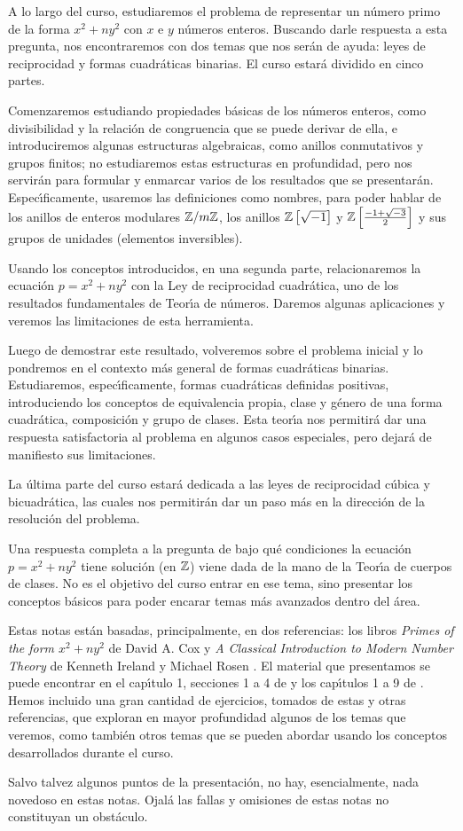 A lo largo del curso, estudiaremos el problema de representar un n\'umero
primo de la forma $x^2+ny^2$ con $x$ e $y$ n\'umeros enteros.
Buscando darle respuesta a esta pregunta, nos encontraremos con dos temas que
nos ser\'an de ayuda: leyes de reciprocidad y formas cuadr\'aticas binarias.
El curso estar\'a dividido en cinco partes.

Comenzaremos estudiando propiedades b\'asicas de los n\'umeros enteros,
como divisibilidad y la relaci\'on de congruencia que se puede derivar de
ella, e introduciremos algunas estructuras algebraicas, como anillos
conmutativos y grupos finitos; no estudiaremos estas estructuras en
profundidad, pero nos servir\'an para formular y enmarcar varios de los
resultados que se presentar\'an. Espec\'{\i}ficamente, usaremos las
definiciones como nombres, para poder hablar de los anillos de enteros
modulares $\Enterosmod[m]$, los anillos $\polinomios \Enteros{\sqrt{-1}}$ y
$\polinomios \Enteros{\frac{-1+\sqrt{-3}} 2}$ y sus grupos de unidades
(elementos inversibles).

Usando los conceptos introducidos, en una segunda parte, relacionaremos
la ecuaci\'on $p=x^2+ny^2$ con la Ley de reciprocidad cuadr\'atica,
uno de los resultados fundamentales de Teor\'{\i}a de n\'umeros.
Daremos algunas aplicaciones y veremos las limitaciones de esta herramienta.

Luego de demostrar este resultado, volveremos sobre el problema inicial y
lo pondremos en el contexto m\'as general de formas cuadr\'aticas binarias.
Estudiaremos, espec\'{\i}ficamente, formas cuadr\'aticas definidas positivas,
introduciendo los conceptos de equivalencia propia, clase y g\'enero de una
forma cuadr\'atica, composici\'on y grupo de clases. Esta teor\'{\i}a nos
permitir\'a dar una respuesta satisfactoria al problema en algunos casos
especiales, pero dejar\'a de manifiesto sus limitaciones.

La \'ultima parte del curso estar\'a dedicada a las leyes de reciprocidad
c\'ubica y bicuadr\'atica, las cuales nos permitir\'an dar un paso m\'as en
la direcci\'on de la resoluci\'on del problema.

Una respuesta completa a la pregunta de bajo qu\'e condiciones la ecuaci\'on
$p=x^2+ny^2$ tiene soluci\'on (en $\Enteros$) viene dada de la mano de la
Teor\'{\i}a de cuerpos de clases. No es el objetivo del curso entrar en ese
tema, sino presentar los conceptos b\'asicos para poder encarar temas m\'as
avanzados dentro del \'area.

Estas notas est\'an basadas, principalmente, en dos referencias: los libros
\emph{Primes of the form $x^2+ny^2$} de David A. Cox \cite{Cox} y
\emph{A Classical Introduction to Modern Number Theory} de Kenneth Ireland y
Michael Rosen \cite{IrelandRosen}.
El material que presentamos se puede encontrar en el cap\'{\i}tulo 1,
secciones 1 a 4 de \cite{Cox} y los cap\'{\i}tulos 1 a 9 de
\cite{IrelandRosen}. Hemos incluido una gran cantidad de ejercicios,
tomados de estas y otras referencias, que exploran en mayor profundidad
algunos de los temas que veremos, como tambi\'en otros temas que se pueden
abordar usando los conceptos desarrollados durante el curso.

Salvo talvez algunos puntos de la presentaci\'on, no hay, esencialmente,
nada novedoso en estas notas. Ojal\'a las fallas y omisiones de estas notas
no constituyan un obst\'aculo.
